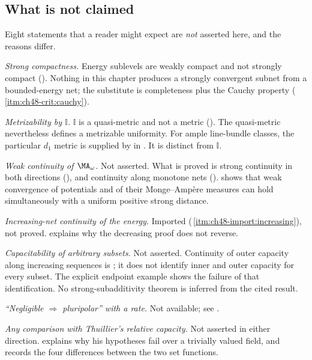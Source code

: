 \subsection{What is not claimed}
\label{sec:ch48-not-claimed}

Eight statements that a reader might expect are \emph{not} asserted here,
and the reasons differ.

\emph{Strong compactness.}  Energy sublevels are weakly compact and not
strongly compact ().  Nothing in this
chapter produces a strongly convergent subnet from a bounded-energy net;
the substitute is completeness plus the Cauchy property
(\,\cref{itm:ch48-crit:cauchy}).

\emph{Metrizability by $\mathbb I$.}  $\mathbb I$ is a quasi-metric and
not a metric (). The quasi-metric
nevertheless defines a metrizable uniformity. For ample line-bundle
classes, the particular $d_1$ metric is supplied by
 in .
It is distinct from $\mathbb I$.

\emph{Weak continuity of $\MA_\omega$.}  Not asserted.  What is proved is
strong continuity in both directions
(), and continuity along monotone nets
().
 shows that weak convergence of potentials
and of their Monge--Amp\`ere measures can hold simultaneously with a
uniform positive strong distance.

\emph{Increasing-net continuity of the energy.}  Imported
(\,\cref{itm:ch48-import:increasing}), not proved.
 explains why the decreasing proof does
not reverse.

\emph{Capacitability of arbitrary subsets.} Not asserted.
Continuity of outer capacity along increasing sequences is
\cite[Theorem~13.29]{BJ22}; it does not identify inner and outer
capacity for every subset. The explicit endpoint example shows the
failure of that identification. No strong-subadditivity theorem is
inferred from the cited result.

\emph{``Negligible $\Rightarrow$ pluripolar'' with a rate.}  Not
available; see .

\emph{Any comparison with Thuillier's relative capacity.}  Not asserted in
either direction.   explains why his hypotheses fail
over a trivially valued field, and  records
the four differences between the two set functions.

